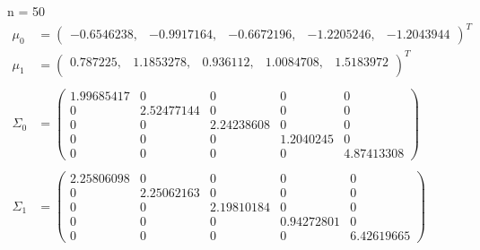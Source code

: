\documentclass[12pt]{article}
\begin{document}
\begin{enumerate}[leftmargin=*]
    \vspace*{1cm}
    n = 50
    \begin{align*}
        \mu_0 &= \begin{pmatrix}
            -0.6546238, & -0.9917164, & -0.6672196, & -1.2205246, & -1.2043944
        \end{pmatrix}^T \\
        \mu_1 &= \begin{pmatrix}
            0.787225, & 1.1853278, & 0.936112, & 1.0084708, & 1.5183972 \\
        \end{pmatrix}^T \\ \\
        \Sigma_0 &= \begin{pmatrix}
            1.99685417 & 0 & 0 & 0 & 0 \\
            0 & 2.52477144 & 0 & 0 & 0 \\
            0 & 0 & 2.24238608 & 0 & 0 \\
            0 & 0 & 0 & 1.2040245 & 0 \\
            0 & 0 & 0 & 0 & 4.87413308 
        \end{pmatrix} \\ \\
        \Sigma_1 &= \begin{pmatrix}
            2.25806098 & 0 & 0 & 0 & 0 \\
            0 & 2.25062163 & 0 & 0 & 0 \\
            0 & 0 & 2.19810184 & 0 & 0 \\
            0 & 0 & 0 & 0.94272801 & 0 \\
            0 & 0 & 0 & 0 & 6.42619665
        \end{pmatrix}
    \end{align*}


\end{enumerate}
\end{document}
